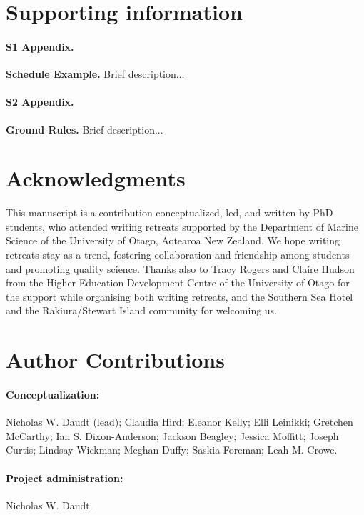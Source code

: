 \documentclass[10pt,letterpaper]{article}
\begin{document}
\section*{Supporting information}

\paragraph*{S1 Appendix.}
\label{S1_Appendix}
{\bf Schedule Example.} Brief description...

\paragraph*{S2 Appendix.}
\label{S2_Appendix}
{\bf Ground Rules.} Brief description...


\section*{Acknowledgments}
This manuscript is a contribution conceptualized, led, and written by PhD students, who attended writing retreats supported by the Department of Marine Science of the University of Otago, Aotearoa New Zealand. We hope writing retreats stay as a trend, fostering collaboration and friendship among students and promoting quality science. Thanks also to Tracy Rogers and Claire Hudson from the Higher Education Development Centre of the University of Otago for the support while organising both writing retreats, and the Southern Sea Hotel and the Rakiura/Stewart Island community for welcoming us. 

\section*{Author Contributions}

\paragraph*{Conceptualization:} Nicholas W. Daudt (lead); Claudia Hird; Eleanor Kelly; Elli Leinikki; Gretchen McCarthy; Ian S. Dixon-Anderson; Jackson Beagley; Jessica Moffitt; Joseph Curtis; Lindsay Wickman; Meghan Duffy; Saskia Foreman; Leah M. Crowe.

\paragraph*{Project administration:} Nicholas W. Daudt.
\end{document}
